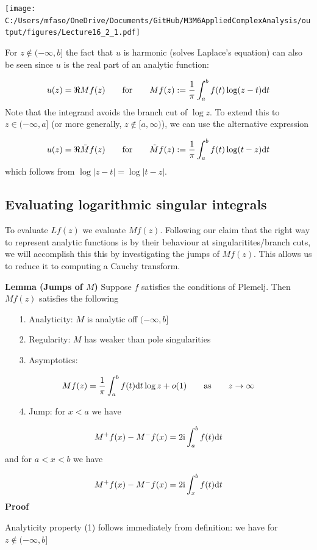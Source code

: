 \documentclass[12pt,landscape]{article}
\def\qqfor{\qquad\hbox{for}\qquad}
\def\qqas{\qquad\hbox{as}\qquad}
\def\D{ {\rm d} }
\def\I{ {\rm i} }
\def\dt{\D t}
\begin{document}
{\texttt{[image: C:/Users/mfaso/OneDrive/Documents/GitHub/M3M6AppliedComplexAnalysis/output/figures/Lecture16\_2\_1.pdf]}

For $z \notin (-\infty,b]$ the fact that $u$ is harmonic (solves Laplace's equation) can also be seen since $u$ is the real part of an analytic function:

\[
    u(z) = \Re Mf(z) \qqfor  Mf(z) := {1 \over \pi} \int_a^b f(t) \log ( z - t) \dt
\]
Note that the integrand avoids the branch cut of $\log z$. To extend this to $z\in (-\infty,a]$ (or more generally, $z \notin [a,\infty)$), we can use the alternative expression

\[
    u(z) = \Re \tilde Mf(z) \qqfor  \tilde Mf(z) := {1 \over \pi} \int_a^b f(t) \log ( t-z) \dt
\]
which follows from $\log|z-t| = \log|t-z|$.
\newpage
\subsection{Evaluating logarithmic singular integrals}
To evaluate $L f(z)$ we evaluate $M f(z)$. Following our claim that the right way to represent analytic functions is by their behaviour at singularitites/branch cuts, we will accomplish this this by investigating the jumps of $M f(z)$. This allows us to reduce it to computing a Cauchy transform.

\textbf{Lemma (Jumps of $M$)} Suppose $f$ satisfies the conditions of Plemelj. Then $M f(z)$ satisfies the following

\begin{itemize}
\item[1. ] Analyticity: $M$ is analytic off $(-\infty,b]$


\item[2. ] Regularity: $M$ has weaker than pole singularities


\item[3. ] Asymptotics:

\end{itemize}
\[
Mf(z) = {1 \over \pi} \int_a^b f(t) \D t \log z + o(1) \qqas z \rightarrow \infty
\]
\begin{itemize}
\item[4. ] Jump: for $x < a$ we have

\end{itemize}
\[
M^+f(x) - M^-f(x) = 2 \I \int_a^b f(t) \D t
\]
and for $a < x < b$ we have

\[
M^+ f(x) - M^-f(x) = 2 \I \int_x^b f(t) \D t
\]
\textbf{Proof}

Analyticity property (1) follows immediately from definition: we have for $z \notin (-\infty,b]$

}
\end{document}
